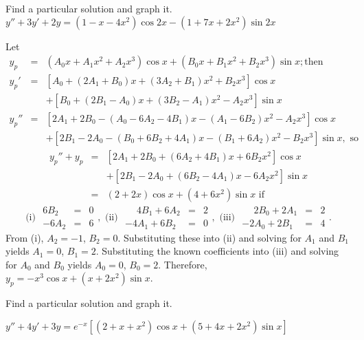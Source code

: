 \documentclass{ximera}
\begin{document}
\begin{problem}\label{exer:5.5.20} Find a particular solution and graph
it. $y''+3y'+2y=(1-x-4x^2)\cos2x-(1+7x+2x^2)\sin2x$

\begin{solution}
    Let
\begin{eqnarray*}
y_p&=&(A_0x+A_1x^2+A_2x^3)\cos x +(B_0x+B_1x^2+B_2x^3)\sin x;\mbox{
then}
\\ y_p'&=&\left[A_0+(2A_1+B_0)x+(3A_2+B_1)x^2+B_2x^3\right]\cos x\\ &&
+\left[B_0+(2B_1-A_0)x+(3B_2-A_1)x^2-A_2x^3\right]\sin x\\
y_p''&=&\left[2A_1+2B_0-(A_0-6A_2-4B_1)x-(A_1-6B_2)x^2-A_2x^3\right]\cos x\\ &&+
\left[2B_1-2A_0-(B_0+6B_2+4A_1)x-(B_1+6A_2)x^2-B_2x^3\right]\sin x, \mbox{ so}
\end{eqnarray*}
\begin{eqnarray*}
y_p''+y_p&=&\left[2A_1+2B_0+(6A_2+4B_1)x+6B_2x^2\right]\cos x\\ && +
\left[2B_1-2A_0+(6B_2-4A_1)x-6A_2x^2\right]\sin x\\
&=&(2+2x)\cos x+(4+6x^2)\sin x \mbox{ if}
\end{eqnarray*}
$$
\mbox{(i) } \begin{array}{rcl} 6B_2&=&0\\-6A_2&=&6\end{array},
\mbox{ (ii) } \begin{array}{rcr}\phantom{-}4B_1+6A_2&=&2
\\-4A_1+6B_2&=&0\end{array},
\mbox{ (iii) } \begin{array}{rcl}\phantom{-}2B_0+2A_1&=&2
\\-2A_0+2B_1&=&4\end{array}.
$$
From (i), $A_2=-1$, $B_2=0$. Substituting these into (ii) and solving
for $A_1$ and $B_1$ yields $A_1=0$, $B_1=2$. Substituting the known
coefficients into (iii) and solving for $A_0$ and $B_0$ yields
$A_0=0$, $B_0=2$. Therefore,$y_p=-x^3\cos x+(x+2x^2)\sin x$.
\end{solution}
\end{problem}

\begin{problem}\label{exer:5.5.21} Find a particular solution and graph
it.

$y''+4y'+3y=e^{-x}\left[(2+x+x^2)\cos x+(5+4x+2x^2)\sin x\right]$
\end{problem}
\end{document}
